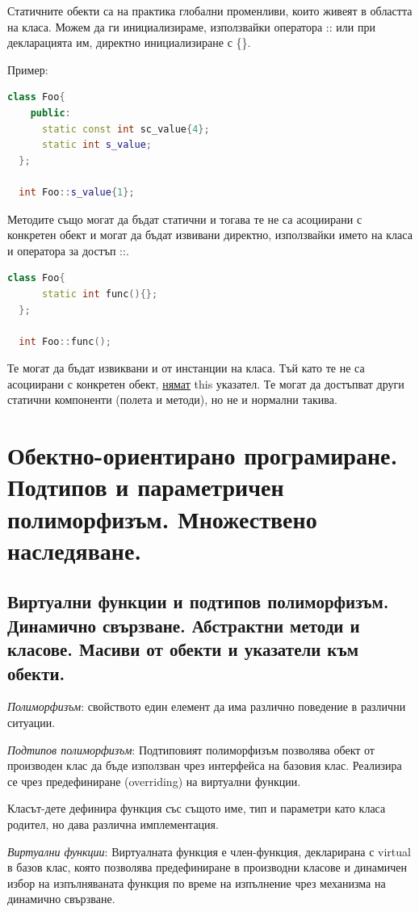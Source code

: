 \documentclass{article}
\renewcommand{\\}{\newline}
\begin{document}
Статичните обекти са на практика глобални променливи, които живеят в областта на класа. Можем да ги инициализираме, използвайки оператора :: или при декларацията им, директно инициализиране с \{\}.

Пример:
\begin{lstlisting}[language=C++]
  class Foo{
    public: 
      static const int sc_value{4};
      static int s_value;
  };

  int Foo::s_value{1};
\end{lstlisting}

Методите също могат да бъдат статични и тогава те не са асоциирани с конкретен обект и могат да бъдат извивани директно, използвайки името на класа и оператора за достъп ::.
\begin{lstlisting}[language=C++]
  class Foo{
      static int func(){};
  };

  int Foo::func();
\end{lstlisting}

Те могат да бъдат извиквани и от инстанции на класа. Тъй като те не са асоциирани с конкретен обект, \underline{нямат} this указател. Те могат да достъпват други статични компоненти (полета и методи), но не и нормални такива.

\newpage
\section{Обектно-ориентирано програмиране. Подтипов и параметричен полиморфизъм. Множествено наследяване.}

\subsection{Виртуални функции и подтипов полиморфизъм. Динамично свързване. Абстрактни методи и класове. Масиви от обекти и указатели към обекти.}

\textit{Полиморфизъм}: свойството един елемент да има различно поведение в различни ситуации. 

\textit{Подтипов полиморфизъм}: Подтиповият полиморфизъм позволява обект от производен клас да бъде използван чрез интерфейса на базовия клас. Реализира се чрез предефиниране (overriding) на виртуални функции.

Класът-дете дефинира функция със същото име, тип и параметри като класа родител, но дава различна имплементация.

\textit{Виртуални функции}: Виртуалната функция е член-функция, декларирана с virtual в базов клас, която позволява предефиниране в производни класове и динамичен избор на изпълняваната функция по време на изпълнение чрез механизма на динамично свързване.
\end{document}
